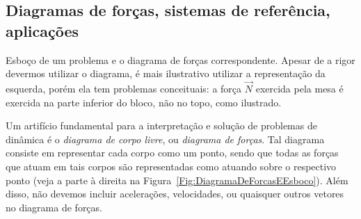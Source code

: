 \subsection{Diagramas de forças, sistemas de referência, aplicações}
\label{Sec:DiagramaDeForcasESisDeRef}

\begin{marginfigure}[3cm]
\centering
{}
\caption{Esboço de um problema e o diagrama de forças correspondente. Apesar de a rigor devermos utilizar o diagrama, é mais ilustrativo utilizar a representação da esquerda, porém ela tem problemas conceituais: a força $\vec{N}$ exercida pela mesa é exercida na parte inferior do bloco, não no topo, como ilustrado.\label{Fig:DiagramaDeForcasEEsboco}}
\end{marginfigure}

Um artifício fundamental para a interpretação e solução de problemas de dinâmica é o \emph{diagrama de corpo livre}, ou \emph{diagrama de forças}. Tal diagrama consiste em representar cada corpo como um ponto, sendo que todas as forças que atuam em tais corpos são representadas como atuando sobre o respectivo ponto (veja a parte à direita na Figura~\ref{Fig:DiagramaDeForcasEEsboco}). Além disso, não devemos incluir acelerações, velocidades, ou quaisquer outros vetores no diagrama de forças.

